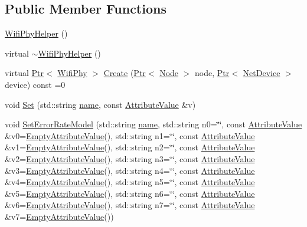 \subsection*{Public Member Functions}
\begin{DoxyCompactItemize}
\item 
\hyperlink{classns3_1_1WifiPhyHelper_a9c34182e2fe144279e57aa10b99d1328}{Wifi\+Phy\+Helper} ()
\item 
virtual \hyperlink{classns3_1_1WifiPhyHelper_a699371b7d2a3474726f27da283f61a4e}{$\sim$\+Wifi\+Phy\+Helper} ()
\item 
virtual \hyperlink{classns3_1_1Ptr}{Ptr}$<$ \hyperlink{classns3_1_1WifiPhy}{Wifi\+Phy} $>$ \hyperlink{classns3_1_1WifiPhyHelper_a0f7f4ce41ebe74cbba4f89bc9a9fec8e}{Create} (\hyperlink{classns3_1_1Ptr}{Ptr}$<$ \hyperlink{classns3_1_1Node}{Node} $>$ node, \hyperlink{classns3_1_1Ptr}{Ptr}$<$ \hyperlink{classns3_1_1NetDevice}{Net\+Device} $>$ device) const =0
\item 
void \hyperlink{classns3_1_1WifiPhyHelper_a2527d6d7b29f717fd7436166c5f05f1a}{Set} (std\+::string \hyperlink{generate__test__data__lte__spectrum__model_8m_ab74e6bf80237ddc4109968cedc58c151}{name}, const \hyperlink{classns3_1_1AttributeValue}{Attribute\+Value} \&v)
\item 
void \hyperlink{classns3_1_1WifiPhyHelper_a219d3ae5881842aa42ea341b985ce114}{Set\+Error\+Rate\+Model} (std\+::string \hyperlink{generate__test__data__lte__spectrum__model_8m_ab74e6bf80237ddc4109968cedc58c151}{name}, std\+::string n0=\char`\"{}\char`\"{}, const \hyperlink{classns3_1_1AttributeValue}{Attribute\+Value} \&v0=\hyperlink{classns3_1_1EmptyAttributeValue}{Empty\+Attribute\+Value}(), std\+::string n1=\char`\"{}\char`\"{}, const \hyperlink{classns3_1_1AttributeValue}{Attribute\+Value} \&v1=\hyperlink{classns3_1_1EmptyAttributeValue}{Empty\+Attribute\+Value}(), std\+::string n2=\char`\"{}\char`\"{}, const \hyperlink{classns3_1_1AttributeValue}{Attribute\+Value} \&v2=\hyperlink{classns3_1_1EmptyAttributeValue}{Empty\+Attribute\+Value}(), std\+::string n3=\char`\"{}\char`\"{}, const \hyperlink{classns3_1_1AttributeValue}{Attribute\+Value} \&v3=\hyperlink{classns3_1_1EmptyAttributeValue}{Empty\+Attribute\+Value}(), std\+::string n4=\char`\"{}\char`\"{}, const \hyperlink{classns3_1_1AttributeValue}{Attribute\+Value} \&v4=\hyperlink{classns3_1_1EmptyAttributeValue}{Empty\+Attribute\+Value}(), std\+::string n5=\char`\"{}\char`\"{}, const \hyperlink{classns3_1_1AttributeValue}{Attribute\+Value} \&v5=\hyperlink{classns3_1_1EmptyAttributeValue}{Empty\+Attribute\+Value}(), std\+::string n6=\char`\"{}\char`\"{}, const \hyperlink{classns3_1_1AttributeValue}{Attribute\+Value} \&v6=\hyperlink{classns3_1_1EmptyAttributeValue}{Empty\+Attribute\+Value}(), std\+::string n7=\char`\"{}\char`\"{}, const \hyperlink{classns3_1_1AttributeValue}{Attribute\+Value} \&v7=\hyperlink{classns3_1_1EmptyAttributeValue}{Empty\+Attribute\+Value}())

\end{DoxyCompactItemize}
